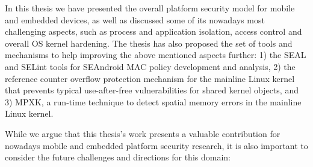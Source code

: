 
In this thesis we have presented the overall platform security model for mobile and embedded devices, as well as discussed some of its nowadays most challenging aspects, such as process and application isolation, access control and overall OS kernel hardening.
The thesis has also proposed the set of tools and mechanisms to help improving the above mentioned aspects further: 1) the SEAL and SELint tools for SEAndroid MAC policy development and analysis, 2) the reference counter overflow protection mechanism for the mainline Linux kernel that prevents typical use-after-free vulnerabilities for shared kernel objects, and 3) MPXK, a run-time technique to detect spatial memory errors in the mainline Linux kernel. 

While we argue that this thesis's work presents a valuable contribution for nowadays mobile and embedded platform security research, it is also important to consider the future challenges and directions for this domain:

